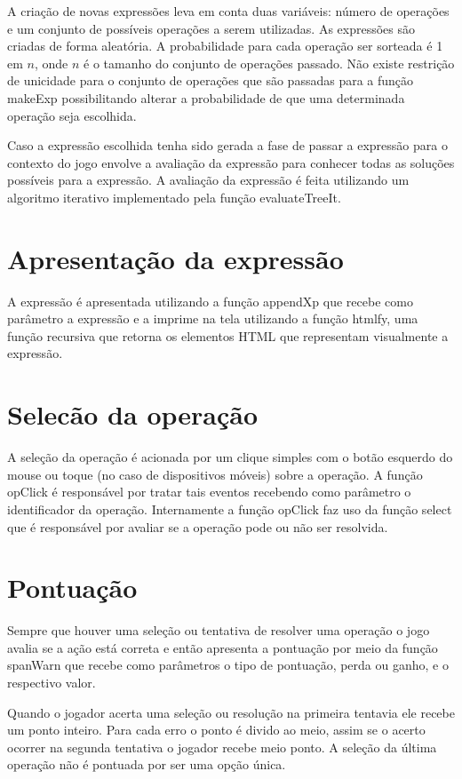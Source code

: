 A criação de novas expressões leva em conta duas variáveis: número de operações e um conjunto de possíveis operações a serem utilizadas. As expressões são criadas de forma aleatória. A probabilidade para cada operação ser sorteada é 1 em $n$, onde $n$ é o tamanho do conjunto de operações passado. 	Não existe restrição de unicidade para o conjunto de operações que são passadas para a função makeExp possibilitando alterar a probabilidade de que uma determinada operação seja escolhida.

Caso a expressão escolhida tenha sido gerada a fase de passar a expressão para o contexto do jogo envolve a avaliação da expressão para conhecer todas as soluções possíveis para a expressão. A avaliação da expressão é feita utilizando um algoritmo iterativo implementado pela função evaluateTreeIt.

\section{Apresentação da expressão}
A expressão é apresentada utilizando a função appendXp que recebe como parâmetro a expressão e a imprime na tela utilizando a função htmlfy, uma função recursiva que retorna os elementos HTML que representam visualmente a expressão.

\section{Selecão da operação}
A seleção da operação é acionada por um clique simples com o botão esquerdo do mouse ou toque (no caso de dispositivos móveis) sobre a operação. A função opClick é responsável por tratar tais eventos recebendo como parâmetro o identificador da operação. Internamente a função opClick faz uso da função select que é responsável por avaliar se a operação pode ou não ser resolvida.

\section{Pontuação}
Sempre que houver uma seleção ou tentativa de resolver uma operação o jogo avalia se a ação está correta e então apresenta a pontuação por meio da função spanWarn que recebe como parâmetros o tipo de pontuação, perda ou ganho, e o respectivo valor.

Quando o jogador acerta uma seleção ou resolução na primeira tentavia ele recebe um ponto inteiro. Para cada erro o ponto é divido ao meio, assim se o acerto ocorrer na segunda tentativa o jogador recebe meio ponto. A seleção da última operação não é pontuada por ser uma opção única.

